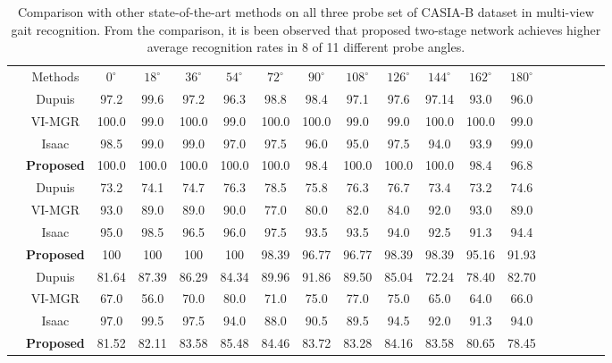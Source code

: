 \begin{table}[t]
	\centering
	\caption{Comparison with other state-of-the-art methods on all three probe set of CASIA-B dataset in multi-view gait recognition. From the comparison, it is been observed that proposed two-stage network achieves higher average recognition rates in 8 of 11 different probe angles.\label{table:comp_multi_view}}
	\setlength{\tabcolsep}{4pt}
	\small
	{\begin{tabular*}{\textwidth}{c|c|cccccccccccccccc|} \cline{1-13}\rule{0pt}{3ex}
		&Methods &${0^{\circ}}$ &${18^{\circ}}$  &${36^{\circ}}$ &${54^{\circ}}$ &${72^{\circ}}$	&${90^{\circ}}$	&${108^{\circ}}$ &${126^{\circ}}$ &${144^{\circ}}$ &${162^{\circ}}$  &${180^{\circ}}$ \\\cline{1-13}\rule{0pt}{3ex}
					
		\multirow{4}{*}{\rotatebox{90}{Normal}} &Dupuis &97.2 &99.6 &97.2 &96.3 &98.8 &98.4 &97.1 &97.6 &97.14 &93.0 &96.0 \\\rule{0pt}{3ex}
		
		&VI-MGR &100.0 &99.0 &100.0 &99.0 &100.0 &100.0 &99.0 &99.0 &100.0 &100.0 &99.0 \\ \rule{0pt}{3ex}
		
		&Isaac &98.5 &99.0 &99.0 &97.0 &97.5 &96.0 &95.0 &97.5 &94.0 &93.9 &99.0 \\\rule{0pt}{3ex}
		
		&\textbf{Proposed} &100.0  &100.0  &100.0  &100.0  &100.0  &98.4  &100.0  &100.0  &100.0  &98.4  &96.8 \\\cline{1-13}\rule{0pt}{3ex}
	
	
	
		\multirow{4}{*}{\rotatebox{90}{Bag}} &Dupuis &73.2 &74.1 &74.7 &76.3 &78.5 &75.8 &76.3 &76.7 &73.4 &73.2 &74.6 \\\rule{0pt}{3ex} 

		&VI-MGR &93.0 &89.0 &89.0 &90.0 &77.0 &80.0 &82.0 &84.0 &92.0 &93.0 &89.0 \\\rule{0pt}{3ex}

		&Isaac &95.0 &98.5 &96.5 &96.0 &97.5 &93.5 &93.5 &94.0 &92.5 &91.3 &94.4 \\\rule{0pt}{3ex}

		&\textbf{Proposed}  &100 &100 &100 &100 &98.39 &96.77 &96.77 &98.39 &98.39 &95.16 &91.93 \\\hline\rule{0pt}{3ex}


		\multirow{4}{*}{\rotatebox{90}{Coat}} &Dupuis &81.64 &87.39 &86.29 &84.34 &89.96 &91.86 &89.50 &85.04 &72.24 &78.40 &82.70\\\rule{0pt}{3ex}
		
		&VI-MGR &67.0 &56.0 &70.0 &80.0 &71.0 &75.0 &77.0 &75.0 &65.0 &64.0 &66.0 \\\rule{0pt}{3ex}
		
		&Isaac &97.0 &99.5 &97.5 &94.0 &88.0 &90.5 &89.5 &94.5 &92.0 &91.3 &94.0 \\\rule{0pt}{3ex}
		
		&\textbf{Proposed} &81.52 &82.11 &83.58 &85.48 &84.46 &83.72 &83.28 &84.16 &83.58 &80.65 &78.45 \\\cline{1-13}
\end{tabular*}}{} 
\end{table}

